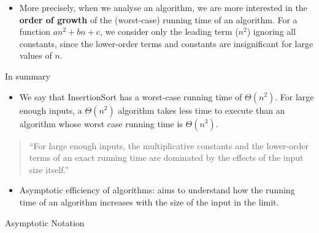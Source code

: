 \begin{frame}

  \begin{itemize}
    \item More precisely, when we analyse an algorithm, we
      are more interested in the {\bf order of growth} of the (worst-case)
      running time of an algorithm. \pause For a function $an^2 + bn +c$, we
       consider only the leading term ($n^2$) ignoring all constants, since the lower-order
         terms and constants are insignificant for large values of $n$.
  \end{itemize}

  \pause
  
  \begin{block}{In summary}
    \begin{itemize}
    \item We say that InsertionSort has a worst-case running time of $\Theta(n^2)$\pause. For large
      enough inputs, a $\Theta(n^2)$ algorithm takes less time to execute than an algorithm whose
      worst case running time is $\Theta(n^3)$. \pause  
    \end{itemize}
  \end{block}
\end{frame}

\begin{frame}
  \begin{quote}
    ``For large enough inputs, the multiplicative constants and the lower-order terms
    of an exact running time are dominated by the effects of the input size itself.'' 
  \end{quote}

\end{frame}

\begin{frame}
  \begin{itemize}
  \item Asymptotic efficiency of algorithms: aims to understand
    how the running time of an algorithm increases with the size
    of the input in the limit. 
  \end{itemize}
\end{frame}

\begin{frame}{Asymptotic Notation}

  \flushright{\itab}
  
\end{frame}

